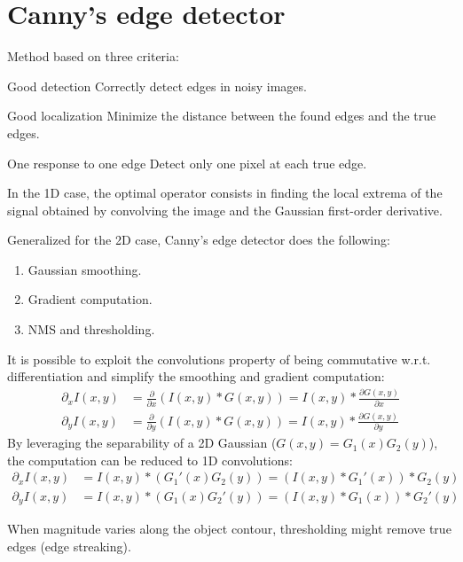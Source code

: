 \section{Canny's edge detector}

Method based on three criteria:
\begin{descriptionlist}
    \item[Good detection] Correctly detect edges in noisy images.
    \item[Good localization] Minimize the distance between the found edges and the true edges.
    \item[One response to one edge] Detect only one pixel at each true edge.
\end{descriptionlist}

In the 1D case, the optimal operator consists in finding the local extrema of the
signal obtained by convolving the image and the Gaussian first-order derivative. 

Generalized for the 2D case, Canny's edge detector does the following: 
\begin{enumerate}
    \item Gaussian smoothing.
    \item Gradient computation.
    \item NMS and thresholding.
\end{enumerate}

It is possible to exploit the convolutions property of being commutative w.r.t. differentiation
and simplify the smoothing and gradient computation:
\[  
    \begin{split}
        \partial_x I(x, y) &= \frac{\partial}{\partial x} ( I(x, y) * G(x, y) ) = I(x, y) * \frac{\partial G(x, y)}{\partial x} \\
        \partial_y I(x, y) &= \frac{\partial}{\partial y} ( I(x, y) * G(x, y) ) = I(x, y) * \frac{\partial G(x, y)}{\partial y}
    \end{split}
\]
By leveraging the separability of a 2D Gaussian ($G(x, y) = G_1(x)G_2(y)$),
the computation can be reduced to 1D convolutions:
\[
    \begin{split}
        \partial_x I(x, y) &= I(x, y) * (G_1'(x)G_2(y)) = (I(x, y) * G_1'(x)) * G_2(y) \\
        \partial_y I(x, y) &= I(x, y) * (G_1(x)G_2'(y)) = (I(x, y) * G_1(x)) * G_2'(y) 
    \end{split}  
\]

\begin{remark}
    When magnitude varies along the object contour, thresholding might remove true edges (edge streaking).
\end{remark}

